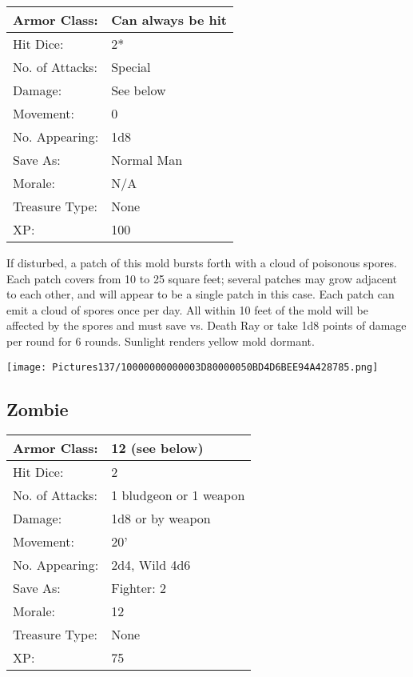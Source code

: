 \documentclass[a4paper,twoside,openany,10pt]{book}
\begin{document}
\begin{multicols}{2}
\begin{tabularx}{0.50\textwidth}{@{}lX@{}}
Armor Class: & Can always be hit \\\hline
Hit Dice: & 2*  \\\hline
No. of Attacks: & Special \\\hline
Damage: & See below \\\hline
Movement: & 0 \\\hline
No. Appearing: & 1d8 \\\hline
Save As: & Normal Man \\\hline
Morale: & N/A \\\hline
Treasure Type: & None \\\hline
XP: & 100 \\\hline
\end{tabularx}

If disturbed, a patch of this mold bursts forth with a cloud of poisonous spores. Each patch covers from 10 to 25 square feet; several patches may grow adjacent to each other, and will appear to be a single patch in this case. Each patch can emit a cloud of spores once per day. All within 10 feet of the mold will be affected by the spores and must save vs. Death Ray or take 1d8 points of damage per round for 6 rounds. Sunlight renders yellow mold dormant.

\begin{center} \texttt{[image: Pictures137/10000000000003D80000050BD4D6BEE94A428785.png]} \end{center}

\subsection*{Zombie}\label{zombie}

\begin{tabularx}{0.50\textwidth}{@{}lX@{}}
Armor Class: & 12 (see below) \\\hline
Hit Dice: & 2 \\\hline
No. of Attacks: & 1 bludgeon or 1 weapon \\\hline
Damage: & 1d8 or by weapon \\\hline
Movement: & 20' \\\hline
No. Appearing: & 2d4, Wild 4d6 \\\hline
Save As: & Fighter: 2 \\\hline
Morale: & 12 \\\hline
Treasure Type: & None \\\hline
XP: & 75 \\\hline
\end{tabularx}\medskip


\end{multicols}
\end{document}

